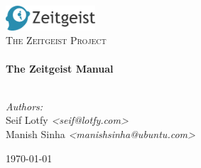 \begin{titlepage}

\begin{center}


\includegraphics[width=0.25\textwidth]{logo.png}\\[1cm]    

\textsc{\LARGE The Zeitgeist Project}\\[1.5cm]


\HRule \\[0.4cm]
{ \huge \bfseries The Zeitgeist Manual}\\[0.4cm]

\HRule \\[1.5cm]

\begin{minipage}{0.8\textwidth}
\begin{flushleft} \large
\emph{Authors:}\\
Seif Lotfy \emph{\textless seif@lotfy.com\textgreater} \\
Manish Sinha \emph{\textless manishsinha@ubuntu.com\textgreater}
\end{flushleft}
\end{minipage}

\vfill

{\large \today}

\end{center}

\end{titlepage}